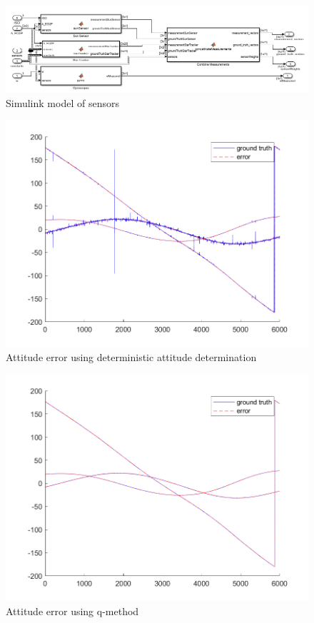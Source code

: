 \begin{figure}[H]
\centering
\includegraphics[scale=0.59]{Images/ps7_problem4_simulink.png}
\caption{Simulink model of sensors}
\label{fig:ps7_problem4_simulink}
\end{figure}

\begin{figure}[H]
\centering
\includegraphics[scale=0.6]{Images/ps7_problem4_DADFict.png}
\caption{Attitude error using deterministic attitude determination}
\label{fig:ps7_problem4_DADFict}
\end{figure}

\begin{figure}[H]
\centering
\includegraphics[scale=0.6]{Images/ps7_problem4_qMethod.png}
\caption{Attitude error using q-method}
\label{fig:ps7_problem4_qMethod}
\end{figure}

